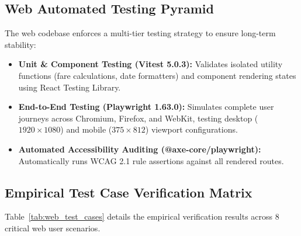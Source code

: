\documentclass[conference,10pt,a4paper]{IEEEtran}
\begin{document}
\subsection{Web Automated Testing Pyramid}
The web codebase enforces a multi-tier testing strategy to ensure long-term stability:
\begin{itemize}
    \item \textbf{Unit \& Component Testing (Vitest 5.0.3):} Validates isolated utility functions (fare calculations, date formatters) and component rendering states using React Testing Library.
    \item \textbf{End-to-End Testing (Playwright 1.63.0):} Simulates complete user journeys across Chromium, Firefox, and WebKit, testing desktop ($1920\times1080$) and mobile ($375\times812$) viewport configurations.
    \item \textbf{Automated Accessibility Auditing (@axe-core/playwright):} Automatically runs WCAG 2.1 rule assertions against all rendered routes.
\end{itemize}

\subsection{Empirical Test Case Verification Matrix}
Table~\ref{tab:web_test_cases} details the empirical verification results across 8 critical web user scenarios.
\end{document}
